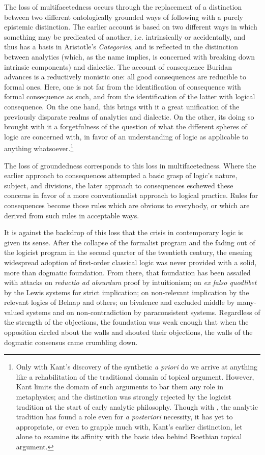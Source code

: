 \documentclass[]{article}
\begin{document}
		The loss of multifacetedness occurs through the replacement of a distinction between two different ontologically grounded ways of following with a purely epistemic distinction. The earlier account is based on two different ways in which something may be predicated of another, i.e. intrinsically or accidentally, and thus has a basis in Aristotle's \textit{Categories}, and is reflected in the distinction between analytics (which, as the name implies, is concerned with breaking down intrinsic components) and dialectic. The account of consequence Buridan advances is a reductively monistic one: all good consequences are reducible to formal ones. Here, one is not far from the identification of consequence with formal consequence as such, and from the identification of the latter with logical consequence. On the one hand, this brings with it a great unification of the previously disparate realms of analytics and dialectic. On the other, its doing so brought with it a forgetfulness of the question of what the different spheres of logic are concerned with, in favor of an understanding of logic as applicable to anything whatsoever.\footnote{Only with Kant's discovery of the synthetic \textit{a priori} do we arrive at anything like a rehabilitation of the traditional domain of topical argument. However, Kant limits the domain of such arguments to bar them any role in metaphysics; and the distinction was strongly rejected by the logicist tradition at the start of early analytic philosophy. Though with \cite{Kripke1980}, the analytic tradition has found a role even for \textit{a posteriori} necessity, it has yet to appropriate, or even to grapple much with, Kant's earlier distinction, let alone to examine its affinity with the basic idea behind Boethian topical argument.}
		
		The loss of groundedness corresponds to this loss in multifacetedness. Where the earlier approach to consequences attempted a basic grasp of logic's nature, subject, and divisions, the later approach to consequences eschewed these concerns in favor of a more conventionalist approach to logical practice. Rules for consequences become those rules which are obvious to everybody, or which are derived from such rules in acceptable ways.
		
		It is against the backdrop of this loss that the crisis in contemporary logic is given its sense. After the collapse of the formalist program and the fading out of the logicist program in the second quarter of the twentieth century, the ensuing widespread adoption of first-order classical logic was never provided with a solid, more than dogmatic foundation. From there, that foundation has been assailed with attacks on \textit{reductio ad absurdum} proof by intuitionism; on \textit{ex falso quodlibet} by the Lewis systems for strict implication; on non-relevant implication by the relevant logics of Belnap and others; on bivalence and excluded middle by many-valued systems and on non-contradiction by paraconsistent systems. Regardless of the strength of the objections, the foundation was weak enough that when the opposition circled about the walls and shouted their objections, the walls of the dogmatic consensus came crumbling down. 
		
\end{document}
